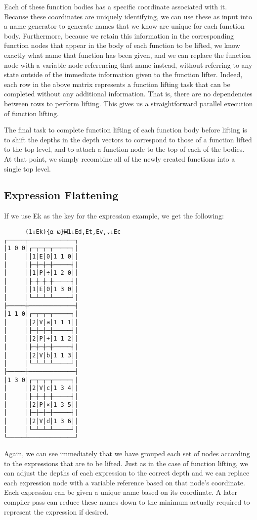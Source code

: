 \documentclass[pldi]{sigplanconf-pldi15}
\begin{document}
Each of these function bodies has a specific coordinate associated with it. Because these coordinates 
are uniquely identifying, we can use these as input into a name generator to generate names that we 
know are unique for each function body. Furthermore, because we retain this information in the 
corresponding function nodes that appear in the body of each function to be lifted, we know exactly what 
name that function has been given, and we can replace the function node with a variable node referencing 
that name instead, without referring to any state outside of the immediate information given to the 
function lifter. Indeed, each row in the above matrix represents a function lifting task that can be 
completed without any additional information. That is, there are no dependencies between rows to perform 
lifting. This gives us a straightforward parallel execution of function lifting. 

The final task to complete function lifting of each function body before lifting is to shift the depths in 
the depth vectors to correspond to those of a function lifted to the top-level, and to attach a function 
node to the top of each of the bodies. At that point, we simply recombine all of the newly created functions 
into a single top level. 
\subsection{Expression Flattening}

If we use Ek as the key for the expression example, we get the following:

\begin{verbatim}
      (1↓Ek){⍺ ⍵}⌸1↓Ed,Et,Ev,⍪↓Ec
┌─────┬─────────────┐
│1 0 0│┌─┬─┬─┬─────┐│
│     ││1│E│0│1 1 0││
│     │├─┼─┼─┼─────┤│
│     ││1│P│÷│1 2 0││
│     │├─┼─┼─┼─────┤│
│     ││1│E│0│1 3 0││
│     │└─┴─┴─┴─────┘│
├─────┼─────────────┤
│1 1 0│┌─┬─┬─┬─────┐│
│     ││2│V│a│1 1 1││
│     │├─┼─┼─┼─────┤│
│     ││2│P│+│1 1 2││
│     │├─┼─┼─┼─────┤│
│     ││2│V│b│1 1 3││
│     │└─┴─┴─┴─────┘│
├─────┼─────────────┤
│1 3 0│┌─┬─┬─┬─────┐│
│     ││2│V│c│1 3 4││
│     │├─┼─┼─┼─────┤│
│     ││2│P│×│1 3 5││
│     │├─┼─┼─┼─────┤│
│     ││2│V│d│1 3 6││
│     │└─┴─┴─┴─────┘│
└─────┴─────────────┘
\end{verbatim}

Again, we can see immediately that we have grouped each set of nodes according to the expressions 
that are to be lifted. Just as in the case of function lifting, we can adjust the depths of each 
expression to the correct depth and we can replace each expression node with a variable reference
 based on that node’s coordinate. Each expression can be given a unique name based on its 
 coordinate. A later compiler pass can reduce these names down to the minimum actually required to 
 represent the expression if desired. 
\end{document}
